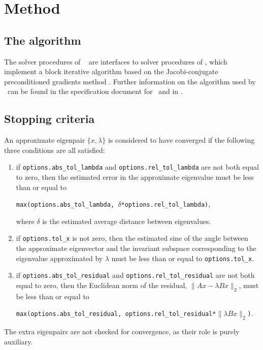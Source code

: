 \section{Method}
\label{sec:method}

\subsection{The algorithm}

The solver procedures of
\fullpackagename\ %
are interfaces to solver procedures of
{\tt \engine}, which 
implement a block iterative algorithm
based on the Jacobi-conjugate preconditioned gradients %
method \cite{jcpg1,jcpg2}.
Further information on the algorithm used by
\fullpackagename\ can be found in the
specification document for \engine\
and in \report.

\subsection{Stopping criteria}

An approximate eigenpair 
$\{x,\lambda\}$ is considered to have converged
if %
the following three conditions are all satisfied:
%
\begin{enumerate}
%
\item
if {\tt options.abs\_tol\_lambda} and 
{\tt options.rel\_tol\_lambda}
are not both equal to zero, then
the estimated error in the approximate eigenvalue
must be less than or equal to

{\tt max(options.abs\_tol\_lambda, 
$\delta$*options.rel\_tol\_lambda)},

where $\delta$ is the estimated average distance
between eigenvalues.
\item
if {\tt options.tol\_x} is not zero, then
the estimated sine of the angle between
the approximate eigenvector and the invariant subspace
corresponding to the eigenvalue 
approximated by $\lambda$
must be less than or equal to {\tt options.tol\_x}.
\item
if {\tt options.abs\_tol\_residual} and 
{\tt options.rel\_tol\_residual}
are not both equal to zero, then
the Euclidean norm of the residual,
$\|A x - \lambda B x\|_2$,
must be less than or equal to

{\tt max(options.abs\_tol\_residual, 
options.rel\_tol\_residual*$\|\lambda B x\|_2$)}.
%
\end{enumerate}
%
The extra eigenpairs are not checked for convergence,
as their role is purely auxiliary.

